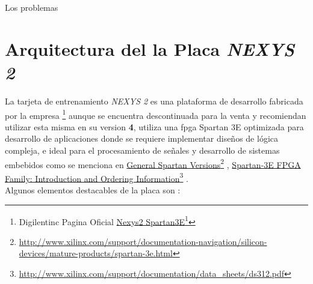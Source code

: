 \documentclass[paper=a4, fontsize=12pt]{article} 		%
\newcommand\fnurl[2]{%
\href{#2}{#1}\footnote{\url{#2}}%
}
\numberwithin{equation}{section}						%
\numberwithin{figure}{section} 							%
\numberwithin{table}{section} 							%
\begin{document}
Los problemas 
\section{Arquitectura del la Placa \emph{NEXYS 2}}
La tarjeta de entrenamiento \emph{NEXYS 2} es una plataforma de desarrollo fabricada por la empresa \footnote{Digilentinc Pagina Oficial \fnurl{Nexys2 Spartan3E}{http://store.digilentinc.com/nexys-2-spartan-3e-fpga-trainer-board-retired-see-nexys-4-ddr/}} aunque se encuentra descontinuada para la venta y recomiendan utilizar esta misma en su version \textbf{4}, utiliza una fpga Spartan 3E optimizada para desarrollo de aplicaciones donde se requiere implementar diseños de lógica compleja, e ideal para el procesamiento de señales y desarrollo de sistemas embebidos como se menciona en \fnurl{General Spartan Versions}{http://www.xilinx.com/support/documentation-navigation/silicon-devices/mature-products/spartan-3e.html}, \fnurl{Spartan-3E FPGA Family: Introduction and Ordering Information}{http://www.xilinx.com/support/documentation/data_sheets/ds312.pdf}.
\\Algunos elementos destacables de la placa son :
\end{document}
